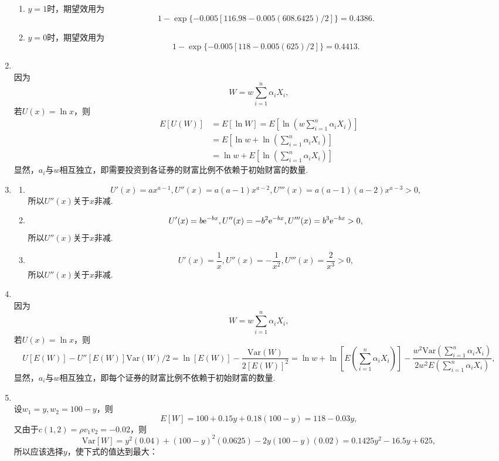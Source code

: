 \begin{enumerate}[label=\arabic{section}.\arabic*]
    \begin{enumerate}[label=\alph*)]
        \item $y=1$时，期望效用为
        \[1-\exp\{-0.005[116.98-0.005(608.6425)/2]\}=0.4386.\]
        \item $y=0$时，期望效用为
        \[1-\exp\{-0.005[118-0.005(625)/2]\}=0.4413.\]
    \end{enumerate}
    \item \pro\\
    因为\[W=w\sum_{i=1}^n \alpha_iX_i,\]
    若$U(x)=\ln x$，则
    \begin{align*}
        E[U(W)]&=E[\ln W]=E\left[\ln\left(w\sum_{i=1}^n \alpha_iX_i\right)\right]\\
        &=E\left[\ln w+\ln\left(\sum_{i=1}^n \alpha_iX_i\right)\right]\\
        &=\ln w+E\left[\ln\left(\sum_{i=1}^n \alpha_iX_i\right)\right]
    \end{align*}
    显然，$a_i$与$w$相互独立，即需要投资到各证券的财富比例不依赖于初始财富的数量.
    \item \pro
    \begin{enumerate}[label=\alph*)]
        \item \[U'(x)=ax^{a-1},U''(x)=a(a-1)x^{a-2},U'''(x)=a(a-1)(a-2)x^{a-3}>0,\]
        所以$U''(x)$关于$x$非减.
        \item \[U'(x)=b\mathrm{e}^{-bx},U''(x)=-b^2\mathrm{e}^{-bx},U'''(x)=b^3\mathrm{e}^{-bx}>0,\]
        所以$U''(x)$关于$x$非减.
        \item \[U'(x)=\frac{1}{x},U''(x)=-\frac{1}{x^2},U'''(x)=\frac{2}{x^3}>0,\]
        所以$U''(x)$关于$x$非减.
    \end{enumerate}
    \item \sol\\
    因为\[W=w\sum_{i=1}^n \alpha_iX_i,\]
    若$U(x)=\ln x$，则\[U[E(W)]-U''[E(W)]\mathrm{Var}(W)/2 = \ln[E(W)]-\frac{\mathrm{Var}(W)}{2[E(W)]^2}=\ln w+\ln \left[E\left(\sum\limits_{i=1}^n \alpha_iX_i\right)\right]-\frac{w^2\mathrm{Var}\left(\sum\limits_{i=1}^n \alpha_iX_i\right)}{2w^2E\left(\sum\limits_{i=1}^n \alpha_iX_i\right)},\]
    显然，$a_i$与$w$相互独立，即每个证券的财富比例不依赖于初始财富的数量.
    \item \sol {\kaishu \textcolor{blue}{注意：这里题干有误，是例9.3b.}}\\
    设$w_1=y,w_2=100-y$，则\[E[W]=100+0.15y+0.18(100-y)=118-0.03y,\]
    又由于$c(1,2)=\rho v_1v_2=-0.02$，则\[\mathrm{Var}[W]=y^2(0.04)+(100-y)^2(0.0625)-2y(100-y)(0.02)=0.1425y^2-16.5y+625,\]
    所以应该选择$y$，使下式的值达到最大：

\end{enumerate}
